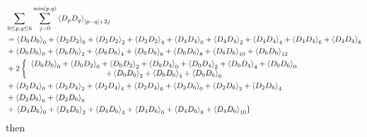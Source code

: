 \documentclass[aps,preprint]{revtex4}%
\begin{document}
\begin{align}
&  \sum_{0\leq p,q\leq6}\sum_{j=0}^{\min\left(  p,q\right)  }\left\langle
D_{p}D_{q}\right\rangle _{\left\vert p-q\right\vert +2j}\nonumber\\
&  =\left\langle D_{0}D_{0}\right\rangle _{0}+\left\langle D_{2}%
D_{2}\right\rangle _{0}+\left\langle D_{2}D_{2}\right\rangle _{2}+\left\langle
D_{2}D_{2}\right\rangle _{4}+\left\langle D_{4}D_{4}\right\rangle
_{0}+\left\langle D_{4}D_{4}\right\rangle _{2}+\left\langle D_{4}%
D_{4}\right\rangle _{4}+\left\langle D_{4}D_{4}\right\rangle _{6}+\left\langle
D_{4}D_{4}\right\rangle _{8}\nonumber\\
&  +\left\langle D_{6}D_{6}\right\rangle _{0}+\left\langle D_{6}%
D_{6}\right\rangle _{2}+\left\langle D_{6}D_{6}\right\rangle _{4}+\left\langle
D_{6}D_{6}\right\rangle _{6}+\left\langle D_{6}D_{6}\right\rangle
_{8}+\left\langle D_{6}D_{6}\right\rangle _{10}+\left\langle D_{6}%
D_{6}\right\rangle _{12}\nonumber\\
&  +2\left\{
\begin{array}
[c]{c}%
\left\langle D_{0}D_{0}\right\rangle _{0}+\left\langle D_{0}D_{2}\right\rangle
_{0}+\left\langle D_{0}D_{2}\right\rangle _{2}+\left\langle D_{0}%
D_{4}\right\rangle _{0}+\left\langle D_{0}D_{4}\right\rangle _{2}+\left\langle
D_{0}D_{4}\right\rangle _{4}+\left\langle D_{0}D_{6}\right\rangle _{0}\\
+\left\langle D_{0}D_{6}\right\rangle _{2}+\left\langle D_{0}D_{6}%
\right\rangle _{4}+\left\langle D_{0}D_{6}\right\rangle _{6}%
\end{array}
\right. \nonumber\\
&  +\left\langle D_{2}D_{4}\right\rangle _{0}+\left\langle D_{2}%
D_{4}\right\rangle _{2}+\left\langle D_{2}D_{4}\right\rangle _{4}+\left\langle
D_{2}D_{4}\right\rangle _{6}+\left\langle D_{2}D_{6}\right\rangle
_{0}+\left\langle D_{2}D_{6}\right\rangle _{2}+\left\langle D_{2}%
D_{6}\right\rangle _{4}\nonumber\\
&  +\left\langle D_{2}D_{6}\right\rangle _{6}+\left\langle D_{2}%
D_{6}\right\rangle _{8}\\
&  +\left.  \left\langle D_{4}D_{6}\right\rangle _{0}+\left\langle D_{4}%
D_{6}\right\rangle _{2}+\left\langle D_{4}D_{6}\right\rangle _{4}+\left\langle
D_{4}D_{6}\right\rangle _{6}+\left\langle D_{4}D_{6}\right\rangle
_{8}+\left\langle D_{4}D_{6}\right\rangle _{10}\right\}
\end{align}
then
\end{document}
